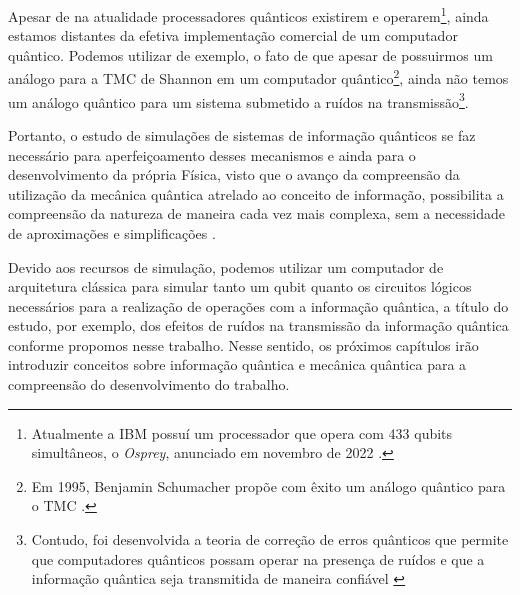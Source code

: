 Apesar de na atualidade processadores quânticos existirem e operarem\footnote{Atualmente a IBM possuí um processador que opera com 433 qubits simultâneos, o \textit{Osprey}, anunciado em novembro de 2022 \cite{osprey}.}, ainda estamos distantes da efetiva implementação comercial de um computador quântico. Podemos utilizar de exemplo, o fato de que apesar de possuirmos um análogo para a TMC de Shannon em um computador quântico\footnote{Em 1995, Benjamin Schumacher propõe com êxito um análogo quântico para o TMC \cite{benschu}.}, ainda não temos um análogo quântico para um sistema submetido a ruídos na transmissão\footnote{Contudo, foi desenvolvida a teoria de correção de erros quânticos que permite que computadores quânticos possam operar na presença de ruídos e que a informação quântica seja transmitida de maneira confiável \cite{chuang}}\cite{chuang}.

Portanto, o estudo de simulações de sistemas de informação quânticos se faz necessário para aperfeiçoamento desses mecanismos e ainda para o desenvolvimento da própria Física, visto que o avanço da compreensão da utilização da mecânica quântica atrelado ao conceito de informação, possibilita a compreensão da natureza de maneira cada vez mais complexa, sem a necessidade de aproximações e simplificações \cite{chuang}.

Devido aos recursos de simulação, podemos utilizar um computador de arquitetura clássica para simular tanto um qubit quanto os circuitos lógicos necessários para a realização de operações com a informação quântica, a título do estudo, por exemplo, dos efeitos de ruídos na transmissão da informação quântica conforme propomos nesse trabalho. Nesse sentido, os próximos capítulos irão introduzir conceitos sobre informação quântica e mecânica quântica para a compreensão do desenvolvimento do trabalho.
